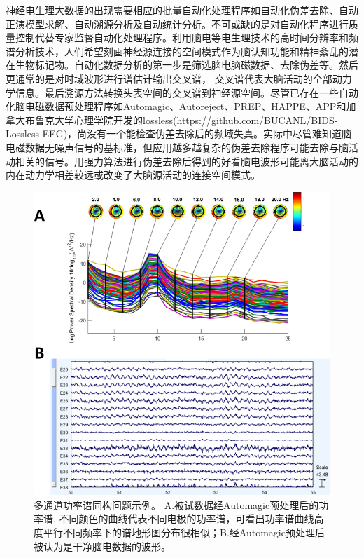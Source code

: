 神经电生理大数据的出现需要相应的批量自动化处理程序如自动化伪差去除、自动正演模型求解、自动溯源分析及自动统计分析。不可或缺的是对自动化程序进行质量控制代替专家监督自动化处理程序。利用脑电等电生理技术的高时间分辨率和频谱分析技术，人们希望刻画神经源连接的空间模式作为脑认知功能和精神紊乱的潜在生物标记物。自动化数据分析的第一步是筛选脑电脑磁数据、去除伪差等。然后更通常的是对时域波形进行谱估计输出交叉谱，
交叉谱代表大脑活动的全部动力学信息。最后溯源方法转换头表空间的交叉谱到神经源空间。尽管已存在一些自动化脑电磁数据预处理程序如Automagic、Autoreject、PREP、HAPPE、APP和加拿大布鲁克大学心理学院开发的lossless(https://github.com/BUCANL/BIDS-Lossless-EEG)，尚没有一个能检查伪差去除后的频域失真。实际中尽管难知道脑电磁数据无噪声信号的基标准，但应用越多越复杂的伪差去除程序可能去除与脑活动相关的信号。用强力算法进行伪差去除后得到的好看脑电波形可能离大脑活动的内在动力学相差较远或改变了大脑源活动的连接空间模式。
\begin{figure}[!h]
\includegraphics[width=15cm]{pic/palos/issue.png}
\caption{多通道功率谱同构问题示例。 A.被试数据经Automagic预处理后的功率谱, 不同颜色的曲线代表不同电极的功率谱，可看出功率谱曲线高度平行不同频率下的谱地形图分布很相似；B.经Automagic预处理后被认为是干净脑电数据的波形。}
\label{5:issue}
\end{figure}

